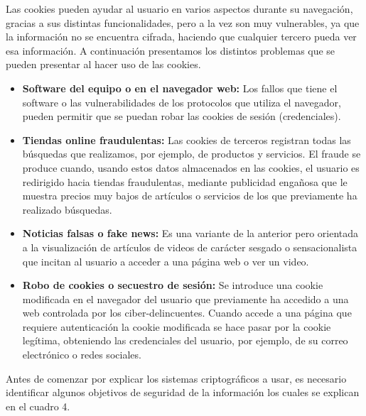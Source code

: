 \documentclass[12pt, a4paper, titlepage]{article}
\begin{document}
		Las cookies pueden ayudar al usuario en varios aspectos durante su navegación, gracias a sus distintas funcionalidades, pero a la vez son muy vulnerables, ya que la información no se encuentra cifrada, haciendo que cualquier tercero pueda ver esa información. A continuación presentamos los distintos problemas que se pueden presentar al hacer uso de las cookies.
		
		\begin{itemize}
		    \item \textbf{Software del equipo o en el navegador web:} Los fallos que tiene el software o las vulnerabilidades de los protocolos que utiliza el navegador, pueden permitir que se puedan robar las cookies de sesión (credenciales).
		    \item \textbf{Tiendas online fraudulentas:} Las cookies de terceros registran todas las búsquedas que realizamos, por ejemplo, de productos y servicios. El fraude se produce cuando, usando estos datos almacenados en las cookies, el usuario es redirigido hacia tiendas fraudulentas, mediante publicidad engañosa que le muestra precios muy bajos de artículos o servicios de los que previamente ha realizado búsquedas.
		    \item \textbf{Noticias falsas o fake news:} Es una variante de la anterior pero orientada a la visualización de artículos de videos de carácter sesgado o sensacionalista que incitan al usuario a acceder a una página web o ver un video.
		    \item \textbf{Robo de cookies o secuestro de sesión:} Se introduce una cookie modificada en el navegador del usuario que previamente ha accedido a una web controlada por los ciber-delincuentes. Cuando accede a una página que requiere autenticación la cookie modificada se hace pasar por la cookie legítima, obteniendo las credenciales del usuario, por ejemplo, de su correo electrónico o redes sociales.
		\end{itemize}
	
		Antes de comenzar por explicar los sistemas criptográficos a usar, es necesario identificar algunos objetivos de seguridad de la información los cuales se explican en el cuadro 4. \cite{refCryptography}\\
		
\end{document}
